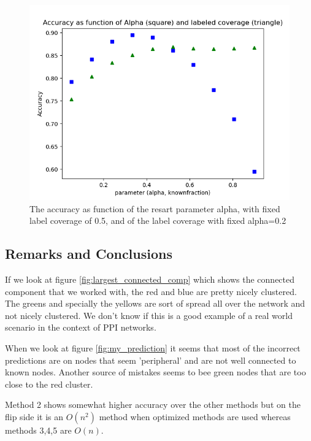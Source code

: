 \begin{figure}[!htb]
\begin{framed}
\centering
\includegraphics[width=\textwidth]{figures/alpha_fraq_graph.png}
\caption{The accuracy as function of the resart parameter alpha,
with fixed label coverage of 0.5, and of the label coverage with
fixed alpha=0.2}
\label{fig:alpha_fracs}
\end{framed}
\end{figure}

\subsection*{Remarks and Conclusions}

If we look at figure \ref{fig:largest_connected_comp} which shows the connected
component that we worked with, the red and blue are pretty nicely clustered. The
greens and specially the yellows are sort of spread all over the network and
not nicely clustered. We don't know if this is a good example of a real world
scenario in the context of PPI networks.

When we look at figure \ref{fig:my_prediction} it seems that most of the
incorrect predictions are on nodes that seem 'peripheral' and  are not well
connected to known nodes. Another source of mistakes seems to bee green nodes
that are too close to the red cluster.

Method 2 shows somewhat higher accuracy over the other methods but on the flip
side it is an $O(n^2)$ method when optimized methods are used whereas methods
3,4,5 are $O(n)$.

